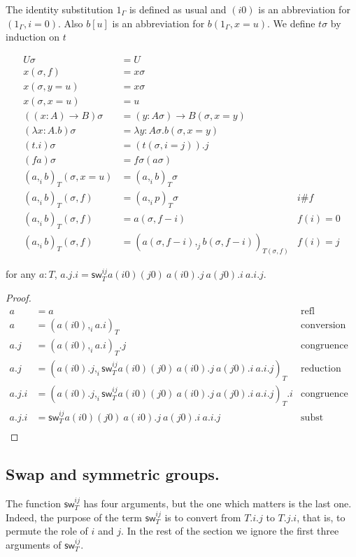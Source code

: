 \documentclass[10pt,a4paper]{article}
\newcommand\CC[4]{(#2,_{#1} #3)_{#4}}
\newcommand\sw[2]{\mathsf{sw}^{#1}_{#2}}
\begin{document}
The identity substitution $1_{Γ}$ is defined as usual and $(i0)$ is
an abbreviation for $(1_{Γ},i=0)$. Also $b[u]$ is an abbreviation for
$b(1_{Γ},x=u)$.
We define $tσ$ by induction on $t$

\begin{align*}
  Uσ &= U \\
  x(σ,f) &= xσ \\
  x(σ,y=u) &= xσ \\
  x(σ,x=u) &= u \\
  ((x:A)→ B)σ &= (y:Aσ) → B(σ,x=y) \\
  (λ x:A. b)σ &= λ y:Aσ. b(σ,x=y) \\
  (t.i)σ &= (t(σ,i=j)).j \\
  (f a)σ &= fσ  (aσ) \\
  (a,_i b)_T(σ,x=u)  &= (a,_i b)_Tσ  \\
  (a,_i b)_T(σ,f)  &= (a,_i p)_Tσ & i \# f \\
  (a,_i b)_T(σ,f)  &= a(σ,f-i) & f(i) = 0 \\
  (a,_i b)_T(σ,f)  &= (a(σ,f-i),_j b(σ,f-i))_{T(σ,f)} & f(i) = j
\end{align*}

\begin{lemma}\label{lem:term-swap}
  for any $a:T$, $a.j.i = \sw {ij} T a(i0)(j0)~a(i0).j~a(j0).i~a.i.j$.
\end{lemma}
\begin{proof}
  \begin{align*}
    a &= a & \text{refl} \\
    a &= \CC i {a(i0)} {a.i} T & \text{conversion rule} \\
    a.j & = \CC i {a(i0)} {a.i} T .j & \text{congruence} \\
    a.j & = \CC i {a(i0).j} {\sw{ij} T a(i0)(j0)~a(i0).j~a(j0).i~a.i.j} T & \text{reduction} \\
    a.j.i & = \CC i {a(i0).j} {\sw{ij} T a(i0)(j0)~a(i0).j~a(j0).i~a.i.j} T.i & \text{congruence} \\
    a.j.i & = \sw{ij} T a(i0)(j0)~a(i0).j~a(j0).i~a.i.j & \text{subst} \\
\end{align*}
\end{proof}

\subsection{Swap and symmetric groups.}

The function $\sw {ij} T$ has four arguments, but the one which
matters is the last one.  Indeed, the purpose of the term $\sw {ij} T$
is to convert from $T.i.j$ to $T.j.i$, that is, to permute the role of
$i$ and $j$. In the rest of the section we ignore the first three
arguments of $\sw {ij} T$.
\end{document}
